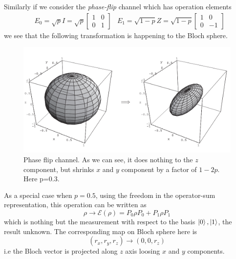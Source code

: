 Similarly if we consider the \textit{phase-flip} channel which has operation elements
\begin{align}
    &E_0 = \sqrt{p}I = \sqrt{p}\begin{bmatrix}
        1 & 0 \\ 0 & 1
    \end{bmatrix}
    &E_1 = \sqrt{1-p}Z = \sqrt{1-p}\begin{bmatrix}
        1 & 0 \\ 0 & -1
    \end{bmatrix}
\end{align}
we see that the following transformation is happening to the Bloch sphere.
\begin{figure}[H]
    \centering
    \includegraphics[width=\textwidth]{images/bit_phase_flip_bloch.PNG}
    \caption{Phase flip channel. As we can see, it does nothing to the $z$ component, but shrinks $x$ and $y$ component by a factor of $1-2p$. Here p=0.3.}   
    \label{fig:phase_flip_bloch}
\end{figure}
As a special case when $p=0.5$, using the freedom in the operator-sum representation, this operation can be written as
\begin{equation}
    \rho \longrightarrow \mathcal{E}(\rho) = P_0\rho P_0 + P_1\rho P_1
\end{equation}
which is nothing but the measurement with respect to the basis $\ket{0}, \ket{1}$, the result unknown. The corresponding map on Bloch sphere here is 
\begin{equation}
    (r_x,r_y,r_z) \longrightarrow (0,0,r_z)
\end{equation}
i.e the Bloch vector is projected along $z$ axis loosing $x$ and $y$ components.

